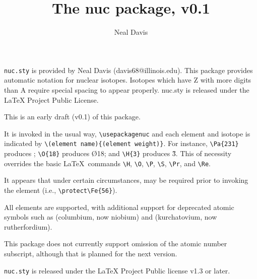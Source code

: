 \documentclass{article}
\author{Neal Davis}
\title{The \textbf{nuc} package, v0.1}
\begin{document}
\maketitle

\texttt{nuc.sty} is provided by Neal Davis (davis68@illinois.edu).  This package provides automatic notation for nuclear isotopes.  Isotopes which have Z with more digits than A require special spacing to appear properly.  nuc.sty is released under the LaTeX Project Public License.

This is an early draft (v0.1) of this package.

It is invoked in the usual way,
    \texttt{\textbackslash usepackage{nuc}}
and each element and isotope is indicated by \texttt{\textbackslash(element name)\{(element weight)\}}.
For instance, \texttt{\textbackslash Pa\{231\}} produces ; \texttt{\textbackslash O\{18\}} produces \O{18}; and \texttt{\textbackslash H\{3\}} produces \H{3}.  This of necessity overrides the basic \LaTeX~commands \texttt{\textbackslash H}, \texttt{\textbackslash O}, \texttt{\textbackslash P}, \texttt{\textbackslash S}, \texttt{\textbackslash Pr}, and \texttt{\textbackslash Re}.

It appears that under certain circumstances, \protect may be required prior to
invoking the element (i.e., \texttt{\textbackslash protect\textbackslash Fe\{56\}}).

All elements are supported, with additional support for deprecated atomic symbols such as  (columbium, now niobium) and  (kurchatovium, now rutherfordium).

This package does not currently support omission of the atomic number subscript,
although that is planned for the next version.

\texttt{nuc.sty} is released under the LaTeX Project Public license v1.3 or later.
\end{document}
